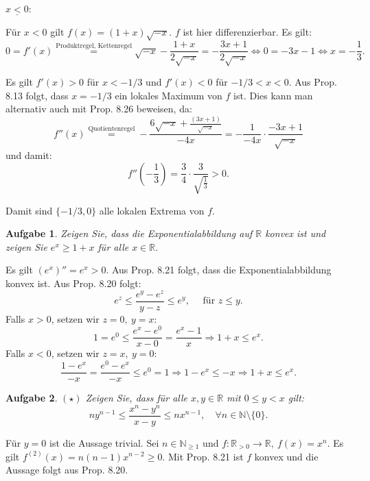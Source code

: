 \documentclass[a4paper, 20]{exam}
\newtheorem{ex}{Aufgabe}
\newcommand\RR{\mathbb{R}}
\newcommand\NN{\mathbb{N}}
\begin{document}
\begin{solution}
\begin{enumerate}[i.)]
$\underline{x<0}$:

F\"ur $x<0$ gilt $f(x)=(1+x)\sqrt{-x}$. $f$ ist hier differenzierbar. Es gilt:
$$ 0=f'(x) \stackrel{\text{Produktregel, Kettenregel}}{=} \sqrt{-x} - \frac{1+x}{2\sqrt{-x}}
=-\frac{3x+1}{2\sqrt{-x}}
\Longleftrightarrow 0= -3x - 1 \Longleftrightarrow x= -\frac{1}{3}.$$

Es gilt $f'(x)>0$ f\"ur $x<-1/3$ und $f'(x)<0$ f\"ur $-1/3 < x < 0$. Aus Prop. 8.13 folgt, dass $x=-1/3$ ein lokales Maximum von $f$ ist. Dies kann man alternativ auch mit Prop. 8.26 beweisen, da:
$$f''(x)
\stackrel{\text{Quotientenregel}}{=} -\frac{6\sqrt{-x} +\frac{(3x+1)}{\sqrt{-x}}}{-4x}
=- \frac{1}{-4x} \cdot \frac{-3x+1}{\sqrt{-x}}$$
und damit:
$$ f''\left( -\frac{1}{3}\right) = \frac{3}{4}\cdot \frac{3}{\sqrt{\frac{1}{3}}}>0.$$

Damit sind $\{ -1/3, 0\}$ alle lokalen Extrema von $f$.
\end{enumerate}
\end{solution}


\begin{ex}
Zeigen Sie, dass die Exponentialabbildung auf $\RR$ konvex ist und zeigen Sie $e^x\geq 1+x$ f\"ur alle $x\in \RR.$
\end{ex}
\begin{solution}
Es gilt $(e^x)''=e^x>0$. Aus Prop. 8.21 folgt, dass die Exponentialabbildung konvex ist. Aus Prop. 8.20 folgt:
$$ e^z \leq \frac{e^y-e^z}{y-z} \leq e^y, \quad \text{ f\"ur } z\leq y. $$
Falls $x>0$, setzen wir $z=0,\ y=x$:
$$ 1= e^0 \leq \frac{e^x - e^0}{x-0} = \frac{e^x-1}{x} \Longrightarrow 1+x \leq e^x.$$
Falls $x<0$, setzen wir $z=x,\ y=0$:
$$ \frac{1-e^x}{-x} = \frac{e^0 -e^x}{-x} \leq e^0 =1  \Longrightarrow 1-e^x \leq -x 
\Longrightarrow 1 +x \leq e^x.$$
\end{solution}


\begin{ex}{$(\star)$}
Zeigen Sie, dass f\"ur alle $x,y \in \RR$ mit $0\leq y<x$ gilt:
$$ ny^{n-1} \leq \frac{x^n - y^n}{x-y} \leq n x^{n-1}, \quad \forall n \in \NN \setminus \{0 \}.$$
\end{ex}
\begin{solution}
F\"ur $y=0$ ist die Aussage trivial. 
Sei $n\in \NN_{\geq 1}$ und $f: \RR_{> 0} \longrightarrow \RR,\ f(x)=x^n$. Es gilt $f^{(2)}(x)= n(n-1)x^{n-2}\geq 0$. Mit Prop. 8.21 ist $f$ konvex und die Aussage folgt aus Prop. 8.20.
\end{solution}
\end{document}
